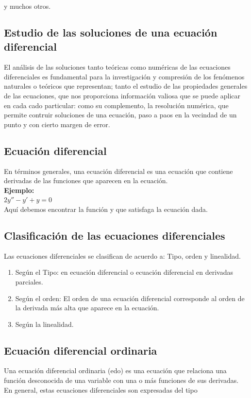 \documentclass{book}
\begin{document}
    y muchos otros.
    \subsection{Estudio de las soluciones de una ecuación diferencial}

     El análisis de las soluciones tanto teóricas como numéricas de las ecuaciones
    diferenciales es fundamental para la investigación y compresión de los fenómenos naturales
    o teóricos que representan; tanto el estudio de las propiedades generales de las ecuaciones, que nos 
    proporciona información valiosa que se puede aplicar en cada cado particular: como su complemento, la resolución numérica,
    que permite contruir soluciones de una ecuación, paso a paos en la vecindad de un punto y con cierto margen de error.
    
    \subsection{Ecuación diferencial}
    En términos generales, una ecuación diferencial es una ecuación que 
    contiene derivadas de las funciones que aparecen en la ecuación.
    \\
    \textbf{Ejemplo:}
    \\
    $2y''-y'+y=0$
    \\ 
    Aquí debemos encontrar la función y que satisfaga la ecuación dada.
    
    \subsection{Clasificación de las ecuaciones diferenciales}
    Las ecuaciones diferenciales se clasifican de acuerdo a:
    Tipo, orden y linealidad.
    
    \begin{enumerate}
        \item Según el Tipo: en ecuación diferencial o ecuación diferencial en derivadas parciales.
        \item Según el orden: El orden de una ecuación diferencial corresponde al orden de la derivada más alta que aparece en la ecuación.
        \item Según la linealidad.
    \end{enumerate}

    \subsection{Ecuación diferencial ordinaria}
     Una ecuación diferencial ordinaria (edo) es una ecuación que relaciona
    una función desconocida de una variable con una o más funciones de sus derivadas.
     En general, estas ecuaciones diferenciales son expresadas del tipo
\end{document}
